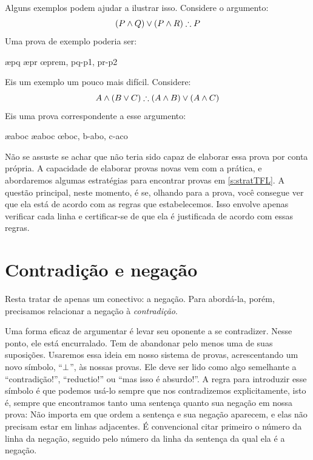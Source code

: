 Alguns exemplos podem ajudar a ilustrar isso. Considere o argumento:
$$(P \eand Q) \eor (P \eand R) \therefore P$$
Uma prova de exemplo poderia ser:
	\begin{fitchproof}
		\PR
			\open
				\AS
				\ae{pq}
			\close
			\open
				\AS
				\ae{pr}
			\close
		\oe{prem, pq-p1, pr-p2}
	\end{fitchproof}
Eis um exemplo um pouco mais difícil. Considere:
	$$ A \eand (B \eor C) \therefore (A \eand B) \eor (A \eand C)$$
Eis uma prova correspondente a esse argumento:
	\begin{fitchproof}
		\hypo{aboc}{A \eand (B \eor C)}\PR
		\ae{aboc}
		\ae{aboc}
		\open
			\hypo{b}{B}\AS
			\ai{a,b}
			\have{abo}{(A \eand B) \eor (A \eand C)}\oi{ab}
		\close
		\open
			\hypo{c}{C}\AS
			\ai{a,c}
			\have{aco}{(A \eand B) \eor (A \eand C)}\oi{ac}
		\close
	\oe{boc, b-abo, c-aco}
	\end{fitchproof}
Não se assuste se achar que não teria sido capaz de elaborar essa prova por conta própria. A capacidade de elaborar provas novas vem com a prática, e abordaremos algumas estratégias para encontrar provas em \cref{s:stratTFL}. A questão principal, neste momento, é se, olhando para a prova, você consegue ver que ela está de acordo com as regras que estabelecemos. Isso envolve apenas verificar cada linha e certificar-se de que ela é justificada de acordo com essas regras.


\section{Contradição e negação}\label{sec:contradiction}

Resta tratar de apenas um conectivo: a negação. Para abordá-la, porém, precisamos relacionar a negação à \emph{contradição}.

Uma forma eficaz de argumentar é levar seu oponente a se contradizer. Nesse ponto, ele está encurralado. Tem de abandonar pelo menos uma de suas suposições. Usaremos essa ideia em nosso sistema de provas, acrescentando um novo símbolo, \textquotedblleft$\bot$\textquotedblright{}, às nossas provas. Ele deve ser lido como algo semelhante a \textquotedblleft{}contradição!\textquotedblright{}, \textquotedblleft{}reductio!\textquotedblright{} ou \textquotedblleft{}mas isso é absurdo!\textquotedblright{}. A regra para introduzir esse símbolo é que podemos usá-lo sempre que nos contradizemos explicitamente, isto é, sempre que encontramos tanto uma sentença quanto sua negação em nossa prova:
Não importa em que ordem a sentença e sua negação aparecem, e elas não
precisam estar em linhas adjacentes. É convencional citar primeiro o
número da linha da negação, seguido pelo número da linha da sentença da
qual ela é a negação.

